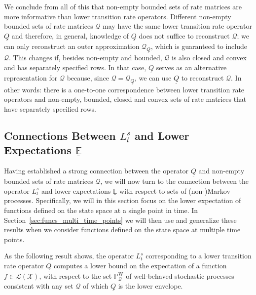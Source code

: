 \documentclass[10pt]{paper}
\theoremstyle{definition}
\newcommand{\states}{\mathcal{X}}
\newcommand{\processes}{\mathbb{P}}
\newcommand{\wprocesses}{\processes^{\mathrm{W}}}
\newcommand{\gambles}{\mathcal{L}}
\newcommand{\gamblesX}{\gambles(\states)}
\newcommand{\rateset}{\mathcal{Q}}
\newcommand{\lrate}{\underline{Q}}
\begin{document}
We conclude from all of this that non-empty bounded sets of rate matrices are more informative than lower transition rate operators. Different non-empty bounded sets of rate matrices $\rateset$ may have the same lower transition rate operator $\lrate$ and therefore, in general, knowledge of $\lrate$ does not suffice to reconstruct $\rateset$; we can only reconstruct an outer approximation $\rateset_{\lrate}$, which is guaranteed to include $\rateset$. This changes if, besides non-empty and bounded, $\rateset$ is also closed and convex and has separately specified rows. In that case, $\lrate$ serves as an alternative representation for $\rateset$ because, since $\rateset=\rateset_{\lrate}$, we can use $\lrate$ to reconstruct $\rateset$. In other words: there is a one-to-one correspondence between lower transition rate operators and non-empty, bounded, closed and convex sets of rate matrices that have separately specified rows.




\subsection{Connections Between $L_t^s$ and Lower Expectations $\underline{\mathbb{E}}$}\label{sec:single_var_lower_exp}

Having established a strong connection between the operator $\lrate$ and non-empty bounded sets of rate matrices $\rateset$, we will now turn to the connection between the operator $L_t^s$ and lower expectations $\underline{\mathbb{E}}$ with respect to sets of (non-)Markov processes. Specifically, we will in this section focus on the lower expectation of functions defined on the state space at a single point in time. In Section~\ref{sec:funcs_multi_time_points} we will then use and generalize these results when we consider functions defined on the state space at multiple time points.

As the following result shows, the operator $L_t^s$ corresponding to a lower transition rate operator $\lrate$ computes a lower bound on the expectation of a function $f\in\gamblesX$, with respect to the set $\wprocesses_\rateset$ of well-behaved stochastic processes consistent with any set $\rateset$ of which $\lrate$ is the lower envelope.
\end{document}
